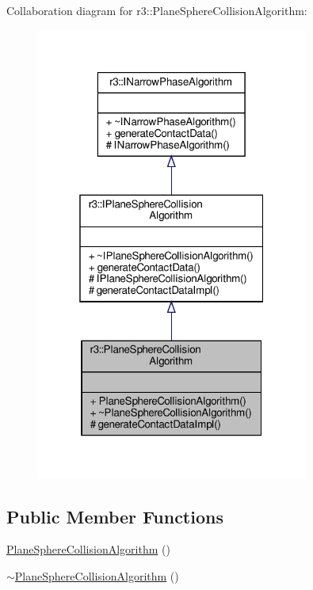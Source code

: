 Collaboration diagram for r3\+:\+:Plane\+Sphere\+Collision\+Algorithm\+:\nopagebreak
\begin{figure}[H]
\begin{center}
\leavevmode
\includegraphics[width=253pt]{classr3_1_1_plane_sphere_collision_algorithm__coll__graph}
\end{center}
\end{figure}
\subsection*{Public Member Functions}
\begin{DoxyCompactItemize}
\item 
\mbox{\hyperlink{classr3_1_1_plane_sphere_collision_algorithm_ab81963394bb97fcee3863f4f2c1aab7a}{Plane\+Sphere\+Collision\+Algorithm}} ()
\item 
\mbox{\hyperlink{classr3_1_1_plane_sphere_collision_algorithm_a6e2fd589987125c9f739ce668346873a}{$\sim$\+Plane\+Sphere\+Collision\+Algorithm}} ()
\end{DoxyCompactItemize}
